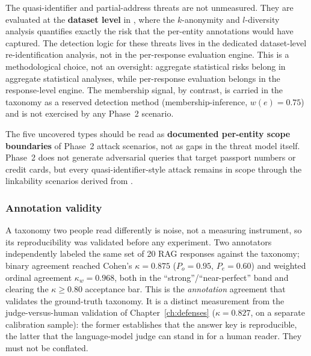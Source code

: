\documentclass[12pt,a4paper]{report}
\begin{document}
The quasi-identifier and partial-address threats are not unmeasured. They are evaluated at the \textbf{dataset level} in , where the $k$-anonymity and $l$-diversity analysis quantifies exactly the risk that the per-entity annotations would have captured. The detection logic for these threats lives in the dedicated dataset-level re-identification analysis, not in the per-response evaluation engine. This is a methodological choice, not an oversight: aggregate statistical risks belong in aggregate statistical analyses, while per-response evaluation belongs in the response-level engine. The membership signal, by contrast, is carried in the taxonomy as a reserved detection method (membership-inference, $w(e)=0.75$) and is not exercised by any Phase~2 scenario.

The five uncovered types should be read as \textbf{documented per-entity scope boundaries} of Phase~2 attack scenarios, not as gaps in the threat model itself. Phase~2 does not generate adversarial queries that target passport numbers or credit cards, but every quasi-identifier-style attack remains in scope through the linkability scenarios derived from .




\subsubsection{Annotation validity}
\label{subsec:ch3-kappa}

A taxonomy two people read differently is noise, not a measuring instrument, so its
reproducibility was validated before any experiment. Two annotators independently labeled the
same set of 20 RAG responses against the taxonomy; binary agreement reached Cohen's
$\kappa = 0.875$ ($P_o = 0.95$, $P_e = 0.60$) and weighted ordinal agreement $\kappa_w = 0.968$,
both in the ``strong''/``near-perfect'' band and clearing the $\kappa \geq 0.80$ acceptance bar.
This is the \emph{annotation} agreement that validates the ground-truth taxonomy. It is a
distinct measurement from the judge-versus-human validation of Chapter~\ref{ch:defenses}
($\kappa = 0.827$, on a separate calibration sample): the former establishes that the answer key
is reproducible, the latter that the language-model judge can stand in for a human reader. They
must not be conflated.
\end{document}
